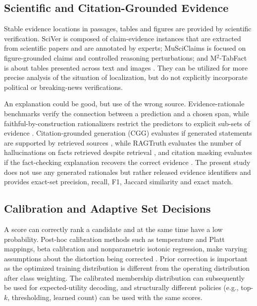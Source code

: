 \subsection{Scientific and Citation-Grounded Evidence}

Stable evidence locations in passages, tables and figures are provided by scientific verification. SciVer is composed of claim-evidence instances that are extracted from scientific papers and are annotated by experts; MuSciClaims is focused on figure-grounded claims and controlled reasoning perturbations; and M$^2$-TabFact is about tables presented across text and images \cite{wang2025sciver,lal2025musciclaims,zhou2025m2tabfact}. They can be utilized for more precise analysis of the situation of localization, but do not explicitly incorporate political or breaking-news verifications.

An explanation could be good, but use of the wrong source. Evidence-rationale benchmarks verify the connection between a prediction and a chosen span, while faithful-by-construction rationalizers restrict the predictors to explicit sub-sets of evidence \cite{deyoung2020eraser,jain2020faithful}. Citation-grounded generation (CGG) evaluates if generated statements are supported by retrieved sources \cite{gao2023alce}, while RAGTruth evaluates the number of hallucinations on facts retrieved despite retrieval \cite{niu2024ragtruth}, and citation masking evaluates if the fact-checking explanation recovers the correct evidence \cite{xing2025attribution}. The present study does not use any generated rationales but rather released evidence identifiers and provides exact-set precision, recall, F1, Jaccard similarity and exact match.

\subsection{Calibration and Adaptive Set Decisions}

A score can correctly rank a candidate and at the same time have a low probability. Post-hoc calibration methods such as temperature and Platt mappings, beta calibration and nonparametric isotonic regression, make varying assumptions about the distortion being corrected \cite{silvafilho2023calibration}. Prior correction is important as the optimized training distribution is different from the operating distribution after class weighting. The calibrated membership distribution can subsequently be used for expected-utility decoding, and structurally different policies (e.g., top-$k$, thresholding, learned count) can be used with the same scores.

